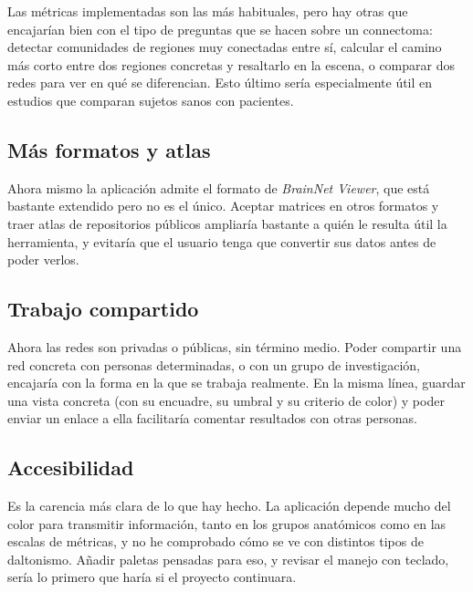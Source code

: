 Las métricas implementadas son las más habituales, pero hay otras que encajarían bien con el tipo de
preguntas que se hacen sobre un connectoma: detectar comunidades de regiones muy conectadas entre sí,
calcular el camino más corto entre dos regiones concretas y resaltarlo en la escena, o comparar dos
redes para ver en qué se diferencian. Esto último sería especialmente útil en estudios que comparan
sujetos sanos con pacientes.

\subsection*{Más formatos y atlas}

Ahora mismo la aplicación admite el formato de \textit{BrainNet Viewer}, que está bastante extendido
pero no es el único. Aceptar matrices en otros formatos y traer atlas de repositorios públicos
ampliaría bastante a quién le resulta útil la herramienta, y evitaría que el usuario tenga que
convertir sus datos antes de poder verlos.

\subsection*{Trabajo compartido}

Ahora las redes son privadas o públicas, sin término medio. Poder compartir una red concreta con
personas determinadas, o con un grupo de investigación, encajaría con la forma en la que se trabaja
realmente. En la misma línea, guardar una vista concreta (con su encuadre, su umbral y su criterio de
color) y poder enviar un enlace a ella facilitaría comentar resultados con otras personas.

\subsection*{Accesibilidad}

Es la carencia más clara de lo que hay hecho. La aplicación depende mucho del color para transmitir
información, tanto en los grupos anatómicos como en las escalas de métricas, y no he comprobado cómo
se ve con distintos tipos de daltonismo. Añadir paletas pensadas para eso, y revisar el manejo con
teclado, sería lo primero que haría si el proyecto continuara.

